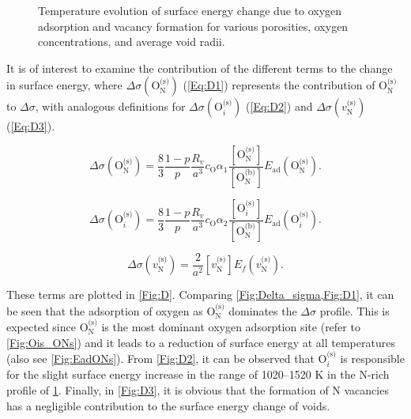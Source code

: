 \documentclass[preprint,12pt,sort&compress]{elsarticle}
\newcommand{\?}{\stackrel{?}{=}}
\begin{document}
\begin{figure}[h!]
\begin{subfigure}{0.48\textwidth}
\end{subfigure}
\caption{Temperature evolution of surface energy change due to oxygen adsorption and vacancy formation for various porosities, oxygen concentrations, and average void radii.}
\label{Fig:Delta_sigma}
\end{figure}

It is of interest to examine the contribution of the different terms to the change in surface energy, where $\Delta \sigma ( \text{O}_\text{N}^\text{(s)} )$ (\cref{Eq:D1}) represents the contribution of $\text{O}_\text{N}^\text{(s)}$ to $\Delta \sigma$, with analogous definitions for $\Delta \sigma ( \text{O}_i^\text{(s)} )$ (\cref{Eq:D2}) and $\Delta \sigma ( v_\text{N}^\text{(s)} )$ (\cref{Eq:D3}). 

\begin{equation}
\Delta \sigma ( \text{O}_\text{N}^{\text{(s)}} ) = \frac{8}{3} \frac{1-p}{p} \frac{R_v}{a^3} c_\text{O} \alpha_1 \frac{ [ \text{O}_\text{N}^{\text{(s)}} ] }{ [ \text{O}_\text{N}^{\text{(b)}} ] }  E_\text{ad}( \text{O}_\text{N}^{\text{(s)}} ).
\label{Eq:D1}
\end{equation}

\begin{equation}
\Delta \sigma ( \text{O}_i^{\text{(s)}} ) = \frac{8}{3} \frac{1-p}{p} \frac{R_v}{a^3} c_\text{O} \alpha_2 \frac{ [ \text{O}_i^{\text{(s)}} ] }{ [ \text{O}_\text{N}^{\text{(b)}} ] }  E_\text{ad}( \text{O}_i^{\text{(s)}} ).
\label{Eq:D2}
\end{equation}

\begin{equation}
\Delta \sigma (v_\text{N}^{\text{(s)}}) = \frac{2}{a^2} [ v_\text{N}^{\text{(s)}} ] E_f ( v_\text{N}^{\text{(s)}} ).
\label{Eq:D3}
\end{equation}

\noindent These terms are plotted in \cref{Fig:D}. Comparing \cref{Fig:Delta_sigma,Fig:D1}, it can be seen that the adsorption of oxygen as $\text{O}_\text{N}^\text{(s)}$ dominates the $\Delta \sigma$ profile. This is expected since $\text{O}_\text{N}^\text{(s)}$ is the most dominant oxygen adsorption site (refer to \cref{Fig:Ois_ONs}) and it leads to a reduction of surface energy at all temperatures (also see \cref{Fig:EadONs}). From \cref{Fig:D2}, it can be observed that $\text{O}_i^\text{(s)}$ is responsible for the slight surface energy increase in the range of 1020--1520 K in the N-rich profile of \cref{Fig:Delta_sigma}. Finally, in \cref{Fig:D3}, it is obvious that the formation of N vacancies has a negligible contribution to the surface energy change of voids.
\end{document}
